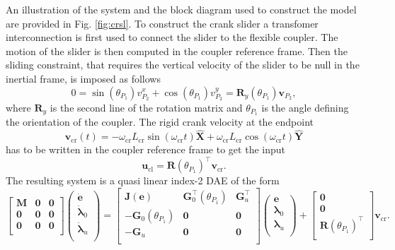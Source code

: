 An illustration of the system and the block diagram used to construct the model are provided in Fig. \ref{fig:crsl}. To construct the crank slider a transfomer interconnection is first used to connect the slider to the flexible coupler. The motion of the slider is then computed in the coupler reference frame. Then the sliding constraint, that requires the vertical velocity of the slider to be null in the inertial frame, is imposed as follows
\[
0 = \sin(\theta_{P_1}) v^x_{P_2} + \cos(\theta_{P_1}) v^y_{P_2} = \mathbf{R}_y(\theta_{P_1}) \mathbf{v}_{P_2},
\]
where $\mathbf{R}_y$ is the second line of the rotation matrix and ${\theta}_{P_1}$ is the angle defining the orientation of the coupler. The rigid crank velocity at the endpoint  
\begin{equation*}
\mathbf{v}_{\text{cr}}(t) = -\omega_{\text{cr}} L _{\text{cr}} \sin(\omega_{\text{cr}} t) \widehat{\mathbf{X}} + \omega_{\text{cr}} L _{\text{cr}} \cos(\omega_{\text{cr}} t) \widehat{\mathbf{Y}}
\end{equation*} 
has to be written in the coupler reference frame to get the input
\begin{equation*}
\mathbf{u}_{\text{cl}} = \mathbf{R}(\theta_{P_1})^\top \mathbf{v}_{\text{cr}}.
\end{equation*}
The resulting system is a quasi linear index-2 DAE of the form
\begin{equation*}
\begin{bmatrix}
\mathbf{M} & \mathbf{0} & \mathbf{0} \\
\mathbf{0} & \mathbf{0} & \mathbf{0} \\
\mathbf{0} & \mathbf{0} & \mathbf{0} \\
\end{bmatrix}
\begin{pmatrix}
\dot{\mathbf{e}} \\ \dot{\bm{\lambda}}_0 \\ \dot{\bm{\lambda}}_u \\
\end{pmatrix}= 
\begin{bmatrix}
\mathbf{J}(\mathbf{e}) & \mathbf{G}_0^\top(\theta_{P_1}) & \mathbf{G}_u^\top \\
-\mathbf{G}_0(\theta_{P_1}) & \mathbf{0} & \mathbf{0} \\
-\mathbf{G}_u & \mathbf{0} & \mathbf{0} \\
\end{bmatrix}
\begin{pmatrix}
\mathbf{e} \\ \bm{\lambda}_0 \\ \bm{\lambda}_u \\
\end{pmatrix} + 
\begin{bmatrix}
\mathbf{0} \\ \mathbf{0} \\ \mathbf{R}(\theta_{P_1})^\top \\
\end{bmatrix}
\mathbf{v}_{\text{cr}}.
\end{equation*}


